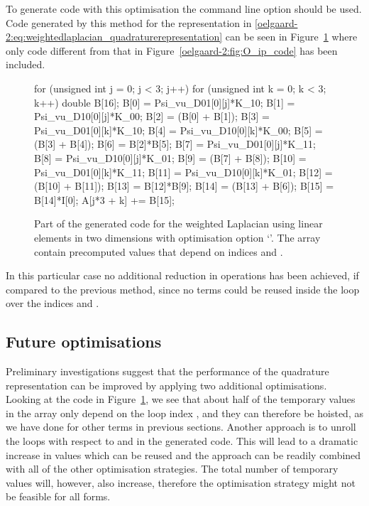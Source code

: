 To generate code with this optimisation the \ffc{} command line option
 should be used.
Code generated by this method for the representation in
\eqref{oelgaard-2:eq:weightedlaplacian_quadraturerepresentation} can be seen in
Figure~\ref{oelgaard-2:fig:O_basis_code} where only code different from
that in Figure~\ref{oelgaard-2:fig:O_ip_code} has been included.
%
\begin{figure}
\begin{code}
for (unsigned int j = 0; j < 3; j++)
{
  for (unsigned int k = 0; k < 3; k++)
  {
    double B[16];
    B[0] = Psi_vu_D01[0][j]*K_10;
    B[1] = Psi_vu_D10[0][j]*K_00;
    B[2] = (B[0] + B[1]);
    B[3] = Psi_vu_D01[0][k]*K_10;
    B[4] = Psi_vu_D10[0][k]*K_00;
    B[5] = (B[3] + B[4]);
    B[6] = B[2]*B[5];
    B[7] = Psi_vu_D01[0][j]*K_11;
    B[8] = Psi_vu_D10[0][j]*K_01;
    B[9] = (B[7] + B[8]);
    B[10] = Psi_vu_D01[0][k]*K_11;
    B[11] = Psi_vu_D10[0][k]*K_01;
    B[12] = (B[10] + B[11]);
    B[13] = B[12]*B[9];
    B[14] = (B[13] + B[6]);
    B[15] = B[14]*I[0];
    A[j*3 + k] += B[15];
  }
}
\end{code}
\caption{Part of the generated code for the weighted Laplacian using linear
         elements in two dimensions with optimisation option
         `'. The array  contain
         precomputed values that depend on indices  and .}
\label{oelgaard-2:fig:O_basis_code}
\end{figure}
%
In this particular case no additional reduction in operations has been
achieved, if compared to the previous method, since no terms could be
reused inside the loop over the indices  and .
%
\subsection{Future optimisations}
%
Preliminary investigations suggest that the performance of the
quadrature representation can be improved by applying two additional
optimisations.
Looking at the code in Figure~\ref{oelgaard-2:fig:O_basis_code}, we see that
about half of the temporary values in the array  only depend on the
loop index , and they can therefore be hoisted, as we have done for other
terms in previous sections.
Another approach is to unroll the loops with respect to  and  in
the generated code.
This will lead to a dramatic increase in values which can be reused and the
approach can be readily combined with all of the other optimisation strategies.
The total number of temporary values will, however, also increase,
therefore the optimisation strategy might not be feasible for all forms.

